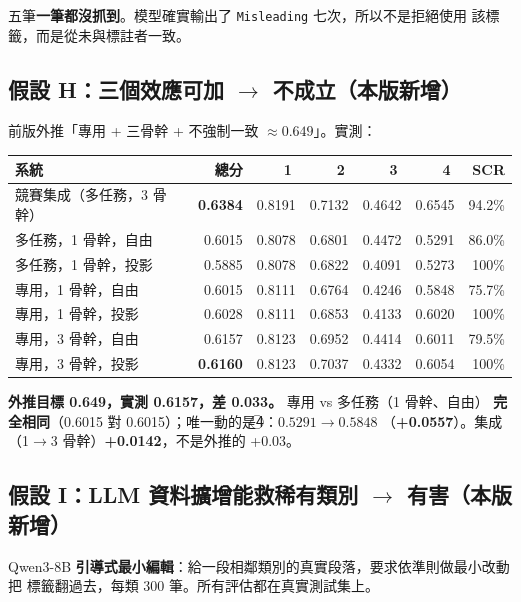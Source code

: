 \documentclass[11pt,a4paper]{ctexart}
\newcommand{\fn}[1]{\texttt{#1}}
\begin{document}
五筆\textbf{一筆都沒抓到}。模型確實輸出了 \fn{Misleading} 七次，所以不是拒絕使用
該標籤，而是從未與標註者一致。

\subsection*{假設 H：三個效應可加 $\to$ 不成立（本版新增）}

前版外推「專用 + 三骨幹 + 不強制一致 $\approx 0.649$」。實測：

\begin{table}[h]
\centering\small
\begin{tabular}{@{}lrrrrrr@{}}
\toprule
系統 & 總分 & \textcircled{1} & \textcircled{2} & \textcircled{3} & \textcircled{4} & SCR \\
\midrule
競賽集成（多任務，3 骨幹） & \textbf{0.6384} & 0.8191 & 0.7132 & 0.4642 & 0.6545 & 94.2\% \\
多任務，1 骨幹，自由 & 0.6015 & 0.8078 & 0.6801 & 0.4472 & 0.5291 & 86.0\% \\
多任務，1 骨幹，投影 & 0.5885 & 0.8078 & 0.6822 & 0.4091 & 0.5273 & 100\% \\
專用，1 骨幹，自由 & 0.6015 & 0.8111 & 0.6764 & 0.4246 & 0.5848 & 75.7\% \\
專用，1 骨幹，投影 & 0.6028 & 0.8111 & 0.6853 & 0.4133 & 0.6020 & 100\% \\
專用，3 骨幹，自由 & 0.6157 & 0.8123 & 0.6952 & 0.4414 & 0.6011 & 79.5\% \\
專用，3 骨幹，投影 & \textbf{0.6160} & 0.8123 & 0.7037 & 0.4332 & 0.6054 & 100\% \\
\bottomrule
\end{tabular}
\end{table}

\textbf{外推目標 0.649，實測 0.6157，差 0.033。} 專用 vs 多任務（1 骨幹、自由）
\textbf{完全相同}（0.6015 對 0.6015）；唯一動的是\textcircled{4}：$0.5291 \to 0.5848$
（\textbf{+0.0557}）。集成（1$\to$3 骨幹）\textbf{+0.0142}，不是外推的 +0.03。

\subsection*{假設 I：LLM 資料擴增能救稀有類別 $\to$ 有害（本版新增）}

Qwen3-8B \textbf{引導式最小編輯}：給一段相鄰類別的真實段落，要求依準則做最小改動把
標籤翻過去，每類 300 筆。所有評估都在真實測試集上。
\end{document}
